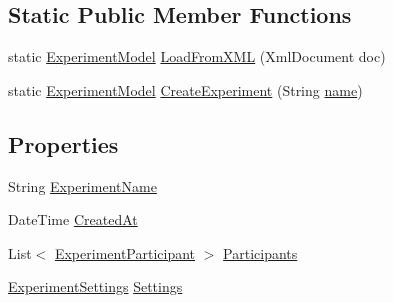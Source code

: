 \subsection*{Static Public Member Functions}
\begin{DoxyCompactItemize}
\item 
static \hyperlink{class_web_analyzer_1_1_models_1_1_base_1_1_experiment_model}{Experiment\+Model} \hyperlink{class_web_analyzer_1_1_models_1_1_base_1_1_experiment_model_a1ae79d69f4572920b709fa3f925ccf71}{Load\+From\+X\+M\+L} (Xml\+Document doc)
\item 
static \hyperlink{class_web_analyzer_1_1_models_1_1_base_1_1_experiment_model}{Experiment\+Model} \hyperlink{class_web_analyzer_1_1_models_1_1_base_1_1_experiment_model_a0e5b2b7b9b003ff62ace53c4fb2da8cf}{Create\+Experiment} (String \hyperlink{_u_i_2_h_t_m_l_resources_2js_2src_2create__experiment_8js_adac2bcb4f01b574cbc63fe8ee2c56bf0}{name})
\end{DoxyCompactItemize}
\subsection*{Properties}
\begin{DoxyCompactItemize}
\item 
String \hyperlink{class_web_analyzer_1_1_models_1_1_base_1_1_experiment_model_ac638be077683d6707e49ca4ae481a0b1}{Experiment\+Name}
\item 
Date\+Time \hyperlink{class_web_analyzer_1_1_models_1_1_base_1_1_experiment_model_a8f50de0ba85fe31f3db2a194a66ed084}{Created\+At}
\item 
List$<$ \hyperlink{class_web_analyzer_1_1_models_1_1_base_1_1_experiment_participant}{Experiment\+Participant} $>$ \hyperlink{class_web_analyzer_1_1_models_1_1_base_1_1_experiment_model_a2429c903e1bd2b062452cfa648238380}{Participants}
\item 
\hyperlink{class_web_analyzer_1_1_models_1_1_settings_model_1_1_experiment_settings}{Experiment\+Settings} \hyperlink{class_web_analyzer_1_1_models_1_1_base_1_1_experiment_model_a00e6e2b80147ab73fc0eee0e7c20d856}{Settings}
\end{DoxyCompactItemize}
